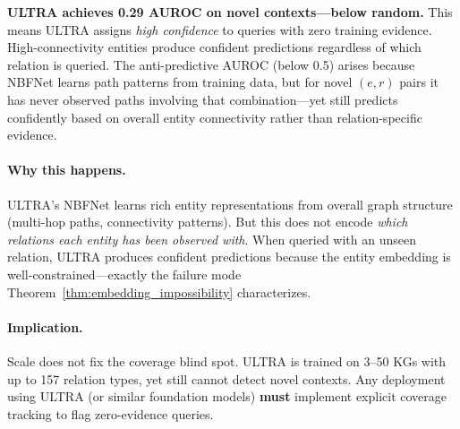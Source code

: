 \textbf{ULTRA achieves 0.29 AUROC on novel contexts---below random.} This means ULTRA assigns \emph{high confidence} to queries with zero training evidence. High-connectivity entities produce confident predictions regardless of which relation is queried. The anti-predictive AUROC (below 0.5) arises because NBFNet learns path patterns from training data, but for novel $(e, r)$ pairs it has never observed paths involving that combination---yet still predicts confidently based on overall entity connectivity rather than relation-specific evidence.

\paragraph{Why this happens.} ULTRA's NBFNet learns rich entity representations from overall graph structure (multi-hop paths, connectivity patterns). But this does not encode \emph{which relations each entity has been observed with}. When queried with an unseen relation, ULTRA produces confident predictions because the entity embedding is well-constrained---exactly the failure mode Theorem~\ref{thm:embedding_impossibility} characterizes.

\paragraph{Implication.} Scale does not fix the coverage blind spot. ULTRA is trained on 3--50 KGs with up to 157 relation types, yet still cannot detect novel contexts. Any deployment using ULTRA (or similar foundation models) \textbf{must} implement explicit coverage tracking to flag zero-evidence queries.

